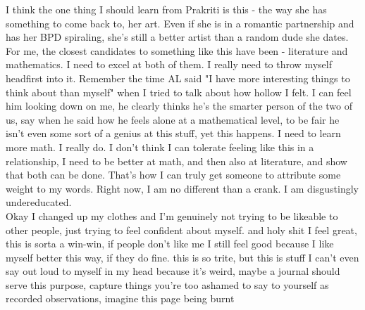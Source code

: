 \noindent {}

I think the one thing I should learn from Prakriti is this - the way she has something to come back to, her art. Even if she is in a romantic partnership and has her BPD spiraling, she's still a better artist than a random dude she dates. For me, the closest candidates to something like this have been - literature and mathematics. I need to excel at both of them. I really need to throw myself headfirst into it. Remember the time AL said "I have more interesting things to think about than myself" when I tried to talk about how hollow I felt. I can feel him looking down on me, he clearly thinks he's the smarter person of the two of us, say when he said how he feels alone at a mathematical level, to be fair he isn't even some sort of a genius at this stuff, yet this happens. I need to learn more math. I really do. I don't think I can tolerate feeling like this in a relationship, I need to be better at math, and then also at literature, and show that both can be done. That's how I can truly get someone to attribute some weight to my words. Right now, I am no different than a crank. I am disgustingly undereducated.\\

Okay I changed up my clothes and I'm genuinely not trying to be likeable to other people, just trying to feel confident about myself. and holy shit I feel great, this is sorta a win-win, if people don't like me I still feel good because I like myself better this way, if they do fine. this is so trite, but this is stuff I can't even say out loud to myself in my head because it's weird, maybe a journal should serve this purpose, capture things you're too ashamed to say to yourself as recorded observations, imagine this page being burnt 